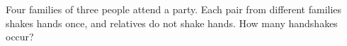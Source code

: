 Four families of three people attend a party. Each pair from different families shakes hands once, and relatives do not shake hands. How many handshakes occur?
